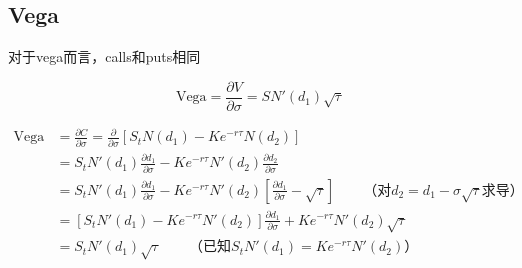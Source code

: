 \documentclass[11pt]{article}
\begin{document}
\subsection{Vega}
对于vega而言，calls和puts相同

\begin{equation*}
    \text{Vega} = \frac{\partial V}{\partial \sigma}  = SN'(d_1)\sqrt{\tau}
\end{equation*}

\begin{align*}
    \text{Vega} &= \frac{\partial C}{\partial \sigma} = \frac{\partial}{\partial \sigma} \left[S_t N(d_1) - K e^{-r\tau}N(d_2)\right] \\
    &= S_t N'(d_1) \frac{\partial d_1}{\partial \sigma} - Ke^{-r\tau}N'(d_2) \frac{\partial d_2}{\partial \sigma} \\
    &= S_t N'(d_1) \frac{\partial d_1}{\partial \sigma} - Ke^{-r\tau}N'(d_2) \left[ \frac{\partial d_1}{\partial \sigma} -\sqrt{\tau} \right] \qquad \text{（对$d_2 = d_1 - \sigma\sqrt{\tau}$求导）} \\
    &= \left[ S_t N'(d_1) - Ke^{-r\tau}N'(d_2) \right] \frac{\partial d_1}{\partial \sigma} + Ke^{-r\tau}N'(d_2) \sqrt{\tau} \\
    &= S_t N'(d_1)\sqrt{\tau} \qquad \text{（已知$S_t N'(d_1) = Ke^{-r\tau}N'(d_2)$）}
\end{align*}
\end{document}
